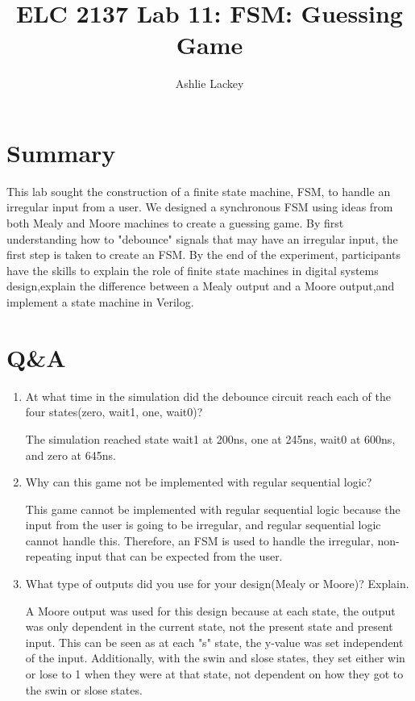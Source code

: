 \documentclass[11pt]{article}
\begin{document}
\title{ELC 2137 Lab 11: FSM: Guessing Game}
\author{Ashlie Lackey}

\maketitle


\section*{Summary}
This lab sought the construction of a finite state machine, FSM, to handle an irregular input from a user. We designed a synchronous FSM using ideas from both Mealy and Moore machines to create a guessing game. By first understanding how to "debounce" signals that may have an irregular input, the first step is taken to create an FSM. By the end of the experiment, participants have the skills to explain the role of finite state machines in digital systems design,explain the difference between a Mealy output and a Moore output,and implement a state machine in Verilog.

\section*{Q\&A}
\begin{enumerate}
  \item At what time in the simulation did the debounce circuit reach each of the four states(zero, wait1, one, wait0)?
  
  The simulation reached state wait1 at 200ns, one at 245ns, wait0 at 600ns, and zero at 645ns.
  
  
  \item Why can this game not be implemented with regular sequential logic?
  
  This game cannot be implemented with regular sequential logic because the input from the user is going to be irregular, and regular sequential logic cannot handle this. Therefore, an FSM is used to handle the irregular, non-repeating input that can be expected from the user.
  
  \item What type of outputs did you use for your design(Mealy or Moore)? Explain.
  
  A Moore output was used for this design because at each state, the output was only dependent in the current state, not the present state and present input. This can be seen as at each "s" state, the y-value was set independent of the input. Additionally, with the swin and slose states, they set either win or lose to 1 when they were at that state, not dependent on how they got to the swin or slose states. 

\end{enumerate}
\end{document}
